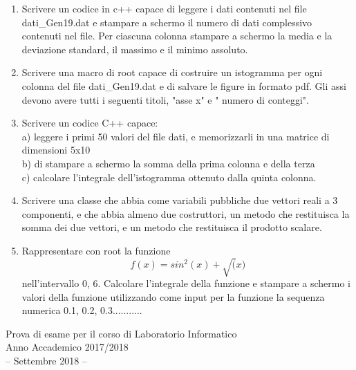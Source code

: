 \documentclass[11pt,fleqn]{book} %
\begin{document}
\begin{enumerate}
\item Scrivere un codice in c++ capace di  leggere i dati contenuti nel file  dati\_Gen19.dat e stampare a schermo il numero di dati complessivo contenuti nel file. Per ciascuna colonna stampare a schermo la media e la deviazione standard, il massimo e il minimo assoluto.

\item Scrivere una macro di root capace di costruire un istogramma per ogni colonna del file dati\_Gen19.dat e di salvare le figure in formato pdf. Gli assi devono avere tutti i seguenti titoli,
"asse x" e " numero di conteggi". 
 

\item Scrivere un codice C++ capace:\\
     a) leggere i primi 50 valori del file dati, e memorizzarli in una matrice di dimensioni 5x10 \\
     b) di stampare a schermo la somma della prima colonna e della terza\\
     c) calcolare l'integrale dell'istogramma ottenuto dalla quinta colonna.

\item Scrivere una classe che abbia come variabili pubbliche due vettori reali a 3 componenti, e che abbia almeno due costruttori, un metodo che restituisca la somma dei due vettori, e un metodo che restituisca il prodotto scalare.

\item Rappresentare con root la funzione 
$$f(x)=sin^2(x)+\sqrt(x)$$
nell'intervallo 0, 6. Calcolare l'integrale della funzione e stampare a schermo i valori della funzione utilizzando come input per la funzione la sequenza numerica 0.1, 0.2, 0.3...........

\end{enumerate}



{
\Large\centering
Prova di esame per il corso di Laboratorio Informatico\\		
Anno Accademico 2017/2018\\
-- Settembre 2018 --\\
}
\end{document}
